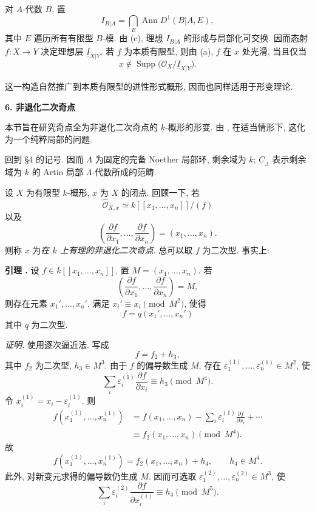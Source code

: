 对 $A$-代数 $B$, 置
\[
I_{B|A}=\bigcap_E\operatorname{Ann}D^1(B|A,E),
\]
其中 $E$ 遍历所有有限型 $B$-模. 由 (c), 理想 $I_{B|A}$ 的形成与局部化可交换. 因而态射 $f:X\longrightarrow Y$ 决定理想层 $\underline I_{X|Y}$. 若 $f$ 为本质有限型, 则由 (a), $f$ 在 $x$ 处光滑, 当且仅当
\[
x\notin\operatorname{Supp}
 \bigl(\mathcal O_X/\underline I_{X|Y}\bigr).
\]


这一构造自然推广到本质有限型的进性形式概形, 因而也同样适用于形变理论.


\par\bigskip
\noindent\textbf{6. 非退化二次奇点}

\medskip
本节旨在研究奇点全为非退化二次奇点的 $k$-概形的形变. 由 , 在适当情形下, 这化为一个纯粹局部的问题.

回到 \S4 的记号. 因而 $\Lambda$ 为固定的完备 Noether 局部环, 剩余域为 $k$; $\underline C_\Lambda$ 表示剩余域为 $k$ 的 Artin 局部 $\Lambda$-代数所成的范畴.

设 $X$ 为有限型 $k$-概形, $x$ 为 $X$ 的闭点. 回顾一下, 若
\[
\widehat{\mathcal O}_{X,x}
 \simeq k[[x_1,\ldots,x_n]]/(f)
\]
以及
\[
\left(\frac{\partial f}{\partial x_1},\ldots,
      \frac{\partial f}{\partial x_n}\right)
=(x_1,\ldots,x_n).
\]
则称 $x$ 为\emph{在 $k$ 上有理的非退化二次奇点}. 总可以取 $f$ 为二次型. 事实上:

\medskip
\noindent\textbf{引理 .}
设 $f\in k[[x_1,\ldots,x_n]]$, 置 $M=(x_1,\ldots,x_n)$. 若
\[
\left(\frac{\partial f}{\partial x_1},\ldots,
      \frac{\partial f}{\partial x_n}\right)=M,
\]
则存在元素 $x_1',\ldots,x_n'$, 满足 $x_i'\equiv x_i\pmod{M^2}$, 使得
\[
f=q(x_1',\ldots,x_n')
\]
其中 $q$ 为二次型.

\smallskip
\noindent\textit{证明.}
使用逐次逼近法. 写成
\[
f=f_2+h_3,
\]
其中 $f_2$ 为二次型, $h_3\in M^3$. 由于 $f$ 的偏导数生成 $M$, 存在 $\varepsilon_1^{(1)},\ldots,\varepsilon_n^{(1)}\in M^2$, 使
\[
\sum_i\varepsilon_i^{(1)}\frac{\partial f}{\partial x_i}
 \equiv h_3\pmod{M^4}.
\]
令 $x_i^{(1)}=x_i-\varepsilon_i^{(1)}$. 则
\[
\begin{aligned}
f(x_1^{(1)},\ldots,x_n^{(1)})
&=f(x_1,\ldots,x_n)
 -\sum_i\varepsilon_i^{(1)}\frac{\partial f}{\partial x_i}
 +\cdots\\
&\equiv f_2(x_1,\ldots,x_n)\pmod{M^4}.
\end{aligned}
\]
故
\[
f(x_1^{(1)},\ldots,x_n^{(1)})
=f_2(x_1,\ldots,x_n)+h_4,
\qquad h_4\in M^4.
\]
此外, 对新变元求得的偏导数仍生成 $M$. 因而可选取 $\varepsilon_1^{(2)},\ldots,\varepsilon_n^{(2)}\in M^3$, 使
\[
\sum_i\varepsilon_i^{(2)}
 \frac{\partial f}{\partial x_i^{(1)}}
 \equiv h_4\pmod{M^5}.
\]

